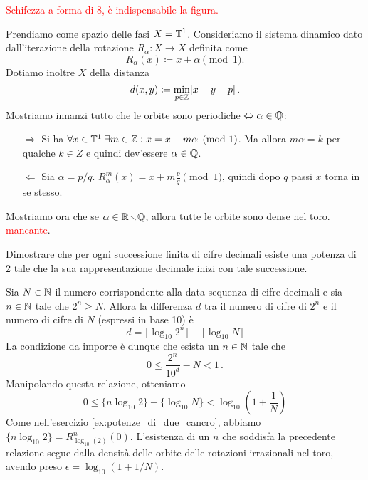 \begin{example}
    \textcolor{red}{Schifezza a forma di 8, è indispensabile la figura.}
\end{example}

\begin{example}
    Prendiamo come spazio delle fasi $ X = \mathbb{T}^1 $. Consideriamo il sistema dinamico dato dall'iterazione della rotazione $ R_\alpha\colon X\to X $ definita come
    \[ R_\alpha(x) \coloneqq x + \alpha \pmod{1}. \]
    Dotiamo inoltre $ X $ della distanza
    \[ d(x,y) \coloneqq \min_{p\in\mathbb{Z}} \abs{x-y-p}. \]
    Mostriamo innanzi tutto che le orbite sono periodiche $ \Leftrightarrow \alpha\in\mathbb{Q} $:
    \begin{itemize}
        \item[$\Rightarrow$] Si ha $ \forall x\in\mathbb{T}^1\; \exists m\in\mathbb{Z} : x = x + m\alpha \pmod{1} $. Ma allora $ m\alpha = k $ per qualche $ k\in Z $ e quindi dev'essere $ \alpha\in\mathbb{Q} $.
        \item[$\Leftarrow$] Sia $ \alpha = p/q $. $ R_\alpha^m(x) = x + m\frac{p}{q} \pmod{1} $, quindi dopo $ q $ passi $ x $ torna in se stesso.
    \end{itemize}
    Mostriamo ora che se $ \alpha\in\mathbb{R}\!\smallsetminus\!\mathbb{Q} $, allora tutte le orbite sono dense nel toro.
    \textcolor{red}{mancante}.
\end{example}

\begin{exercise}
    Dimostrare che per ogni successione finita di cifre decimali esiste una potenza di 2 tale che la sua rappresentazione decimale inizi con tale successione.
\end{exercise}
\begin{solution}
    Sia $ N\in\mathbb{N} $ il numero corrispondente alla data sequenza di cifre decimali e sia $ n\in\mathbb{N} $ tale che $ 2^n \geq N $. Allora la differenza $ d $ tra il numero di cifre di $ 2^n $ e il numero di cifre di $ N $ (espressi in base 10) è
    \[ d = \lfloor \log_{10}2^n\rfloor - \lfloor \log_{10}N \rfloor \]
    La condizione da imporre è dunque che esista un $ n\in\mathbb{N} $ tale che
    \[ 0 \leq \frac{2^n}{10^{d}} - N < 1 \, . \]
    Manipolando questa relazione, otteniamo
    \[ 0 \leq \{ n\log_{10}2 \} - \{ \log_{10}N \} < \log_{10}\left( 1 + \frac{1}{N} \right) \]
    Come nell'esercizio \ref{ex:potenze_di_due_cancro}, abbiamo $ \{ n\log_{10}2 \} = R^n_{\log_{10}(2)}(0) $. L'esistenza di un $ n $ che soddisfa la precedente relazione segue  dalla densità delle orbite delle rotazioni irrazionali nel toro, avendo preso $ \epsilon = \log_{10}\left( 1 + 1/N \right) $.
\end{solution}


